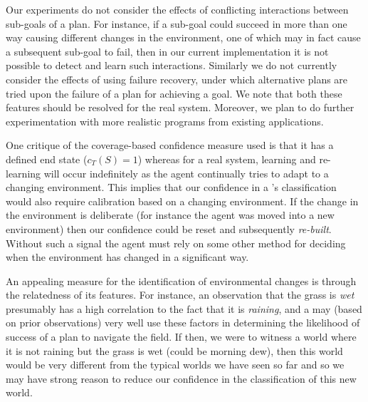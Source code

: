 %

Our experiments do not consider the effects of conflicting interactions between sub-goals of a plan. For instance, if a sub-goal could succeed in more than one way causing different changes in the environment, one of which may in fact cause a subsequent sub-goal to fail, then in our current implementation it is not possible to detect and learn such interactions. Similarly we do not currently consider the effects of using failure recovery, under which alternative plans are tried upon the failure of a plan for achieving a goal. We note that both these features should be resolved for the real system. Moreover, we plan to do further experimentation with more realistic programs from existing applications. 

One critique of the coverage-based confidence measure used is that it has a defined end state ($c_T(S)=1$) whereas for a real system, learning and re-learning will occur indefinitely as the agent continually tries to adapt to a changing environment. This implies that our confidence in a \dt's classification would also require calibration based on a changing environment. If the change in the environment is deliberate (for instance the agent was moved into a new environment) then our confidence could be reset and subsequently \textit{re-built}. Without such a signal the agent must rely on some other method for deciding when the environment has changed in a significant way.

An appealing measure for the identification of environmental changes is through the relatedness of its features. For instance, an observation that the grass is \textit{wet} presumably has a high correlation to the fact that it is \textit{raining}, and a \dt may (based on prior observations) very well use these factors in determining the likelihood of success of a plan to navigate the field. If then, we were to witness a world where it is not raining but the grass is wet (could be morning dew), then this world would be very different from the typical worlds we have seen so far and so we may have strong reason to reduce our confidence in the \dt classification of this new world.



